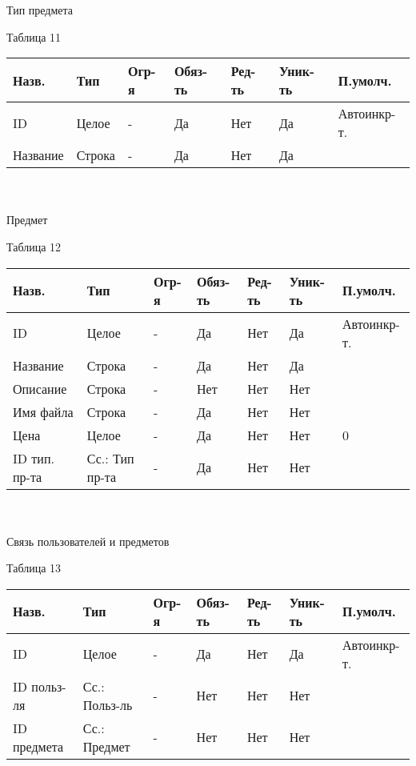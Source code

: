 \documentclass[../document.tex]{subfiles}
\begin{document}
Тип предмета
\begin{flushright}
  Таблица 11
\end{flushright}
\begin{tabular}{ | l | l | l | l | l | l | l | }
  \hline
  Назв.    & Тип    & Огр-я & Обяз-ть & Ред-ть & Уник-ть & П.умолч.    \\
  \hline
  ID       & Целое  & -     & Да      & Нет    & Да      & Автоинкр-т. \\
  Название & Строка & -     & Да      & Нет    & Да      &             \\
  \hline
\end{tabular}
\\\\
Предмет
\begin{flushright}
  Таблица 12
\end{flushright}
\begin{tabular}{ | l | l | l | l | l | l | l | }
  \hline
  Назв.         & Тип            & Огр-я & Обяз-ть & Ред-ть & Уник-ть & П.умолч.    \\
  \hline
  ID            & Целое          & -     & Да      & Нет    & Да      & Автоинкр-т. \\
  Название      & Строка         & -     & Да      & Нет    & Да      &             \\
  Описание      & Строка         & -     & Нет     & Нет    & Нет     &             \\
  Имя файла     & Строка         & -     & Да      & Нет    & Нет     &             \\
  Цена          & Целое          & -     & Да      & Нет    & Нет     & 0           \\
  ID тип. пр-та & Сс.: Тип пр-та & -     & Да      & Нет    & Нет     &             \\
  \hline
\end{tabular}
\\\\
Связь пользователей и предметов
\begin{flushright}
  Таблица 13
\end{flushright}
\begin{tabular}{ | l | l | l | l | l | l | l | }
  \hline
  Назв.       & Тип           & Огр-я & Обяз-ть & Ред-ть & Уник-ть & П.умолч.    \\
  \hline
  ID          & Целое         & -     & Да      & Нет    & Да      & Автоинкр-т. \\
  ID польз-ля & Сс.: Польз-ль & -     & Нет     & Нет    & Нет     &             \\
  ID предмета & Сс.: Предмет  & -     & Нет     & Нет    & Нет     &             \\
  \hline
\end{tabular}
\end{document}
